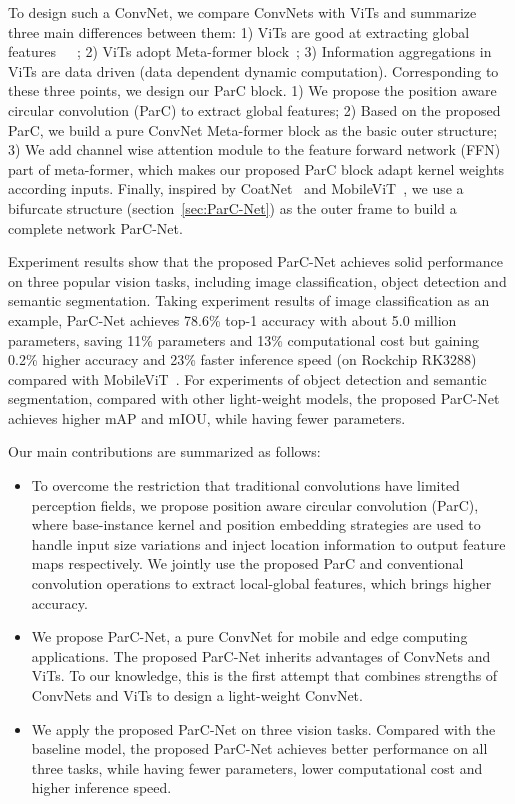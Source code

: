\documentclass[10pt,twocolumn,letterpaper]{article}
\begin{document}
To design such a ConvNet, we compare ConvNets with ViTs and summarize three main differences between them: 1) ViTs are good at extracting global features~\cite{chen2021mobile}~\cite{mehta2022mobilevit}~\cite{dai2021coatnet}; 2) ViTs adopt Meta-former block~\cite{yu2021metaformer}; 3) Information aggregations in ViTs are data driven (data dependent dynamic computation). Corresponding to these three points, we design our ParC block. 1) We propose the position aware circular convolution (ParC) to extract global features; 2) Based on the proposed ParC, we build a pure ConvNet Meta-former block as the basic outer structure; 3) We add channel wise attention module to the feature forward network (FFN) part of meta-former, which makes our proposed ParC block adapt kernel weights according inputs. Finally, inspired by CoatNet~\cite{dai2021coatnet} and MobileViT~\cite{mehta2022mobilevit}, we use a bifurcate structure (section~\ref{sec:ParC-Net}) as the outer frame to build a complete network ParC-Net. 

Experiment results show that the proposed ParC-Net achieves solid performance on three popular vision tasks, including image classification, object detection and semantic segmentation. Taking experiment results of image classification as an example,  ParC-Net achieves 78.6\% top-1 accuracy with about 5.0 million parameters, saving 11\% parameters and 13\% computational cost  but  gaining  0.2\%  higher  accuracy  and  23\% faster inference  speed (on Rockchip RK3288) compared with MobileViT~\cite{mehta2022mobilevit}. For experiments of object detection and semantic segmentation, compared with other light-weight models, the proposed ParC-Net achieves higher mAP and mIOU, while having fewer parameters. 

Our main contributions are summarized as follows:

\begin{itemize}
\item To overcome the restriction that traditional convolutions have limited perception fields, we propose position aware circular convolution (ParC), where base-instance kernel and position embedding strategies are used to handle input size variations and inject location information to output feature maps respectively. We jointly use the proposed ParC and conventional convolution operations to extract local-global features, which brings higher accuracy.

\item We propose ParC-Net, a pure ConvNet for mobile and edge computing applications. The proposed ParC-Net inherits advantages of ConvNets and ViTs. To our knowledge, this is the first attempt that combines strengths of ConvNets and ViTs to design a light-weight ConvNet. 

\item We apply the proposed ParC-Net on three vision tasks. Compared with the baseline model, the proposed ParC-Net achieves better performance on all three tasks, while having fewer parameters, lower computational cost and higher inference speed. 

\end{itemize}
\end{document}
